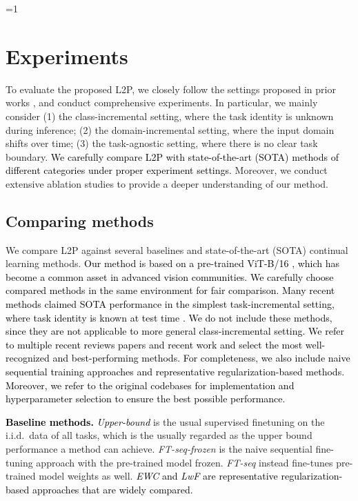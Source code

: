 \documentclass[10pt,twocolumn,letterpaper]{article}
\newcommand{\zizhaoz}[1]{\textcolor{black}{#1}}
\newcommand{\zifeng}[1]{\textcolor{black}{#1}}
\newcommand{\cam}[1]{\textcolor{black}{#1}}
\newcommand{\methodabbr}{L2P\xspace}
\newcounter{alphasect}
\def\alphainsection{0}
\let\oldsection=\section
\def\section{%
  \ifnum\alphainsection=1%
    \addtocounter{alphasect}{1}
  \fi%
\oldsection}%
\begin{document}
\section{Experiments} \label{sec:experiments}

To evaluate the proposed  \methodabbr, we closely follow the settings proposed in prior works \cite{lopez2017gradient,zeno2018task, van2019three}, and conduct comprehensive experiments. %
In particular, we mainly consider (1) the class-incremental setting, where the task identity is unknown during inference; (2) the domain-incremental setting, where the input domain shifts over time; (3) the task-agnostic setting, where there is no clear task boundary. 
\cam{We carefully compare \methodabbr with state-of-the-art (SOTA) methods of different categories under proper experiment settings.}
Moreover, we conduct extensive ablation studies to provide a deeper understanding of our method. 



\subsection{Comparing methods} 
We compare \methodabbr against several baselines and state-of-the-art (SOTA) continual learning methods. \zizhaoz{Our method is based on a pre-trained ViT-B/16 \cite{vit,zhang2021aggregating}, which has become a common asset in advanced vision communities.
We carefully choose compared methods in the same environment for fair comparison.} \zifeng{Many recent methods claimed SOTA performance in the simplest task-incremental setting, where task identity is known at test time \cite{veniat2020efficient, ke2020continual, pham2020contextual}. 
We do not include these methods, since they are not applicable to more general class-incremental setting. %
We refer to multiple recent reviews papers \cite{delange2021continual, mai2021online} and recent work \cite{buzzega2020dark, prabhu2020gdumb, cha2021co2l} and select the most well-recognized and best-performing methods. For completeness, we also include naive sequential training approaches and representative regularization-based methods.}
\zifeng{Moreover, we refer to the original codebases for implementation and hyperparameter selection to ensure the best possible performance.
} 

\cam{\textbf{Baseline methods.}}
\zifeng{\emph{Upper-bound}} is the usual supervised finetuning on the i.i.d.~data of all tasks, which is the usually regarded as the upper bound performance a method can achieve. 
\emph{FT-seq-frozen} is the naive sequential fine-tuning approach with the pre-trained model frozen. 
\emph{FT-seq} instead fine-tunes pre-trained model weights as well. 
\zifeng{\emph{EWC} \cite{kirkpatrick2017overcoming} and \emph{LwF} \cite{li2017learning} are representative regularization-based approaches that are widely compared.}
\end{document}

